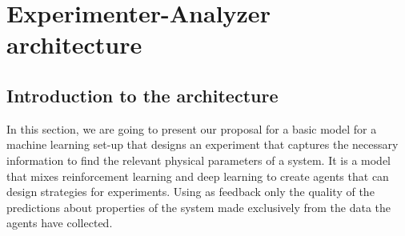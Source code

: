 \documentclass[11pt,a4paper,twoside]{report}
\newcommand{\+}{\textnormal{+} }
\theoremstyle{definition}
\newtheorem{mydef}[mythm]{Definition}
\newtheorem{myex}[mythm]{Example}
\numberwithin{equation}{chapter}
\begin{document}






\chapter{Experimenter-Analyzer architecture} \label{EAmodel}

\section{Introduction to the architecture}

In this section, we are going to present our proposal for a basic model for a
machine learning set-up that designs an experiment that captures the necessary
information to find the relevant physical parameters of a system. It is a model
that mixes reinforcement learning and deep learning to create agents that
can design strategies for experiments. Using as feedback only
the quality of the predictions about properties of the system made
exclusively from the data the agents have collected. 
\end{document}
